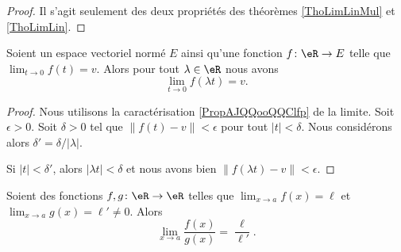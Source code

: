 \begin{proof}
	Il s'agit seulement des deux propriétés des théorèmes \ref{ThoLimLinMul} et \ref{ThoLimLin}.
\end{proof}

\begin{lemma}       \label{LEMooYJGLooVBaglB}
	Soient un espace vectoriel normé \( E\) ainsi qu'une fonction \( f\colon \eR\to E\) telle que \( \lim_{t\to 0} f(t)=v\). Alors pour tout \( \lambda\in \eR\) nous avons
	\begin{equation}
		\lim_{t\to 0} f(\lambda t)=v.
	\end{equation}
\end{lemma}

\begin{proof}
	Nous utilisons la caractérisation \eqref{PropAJQQooQQClfp} de la limite. Soit \( \epsilon>0\). Soit \( \delta>0\) tel que \( \| f(t)-v \|<\epsilon\) pour tout \( | t |<\delta\). Nous considérons alors \( \delta'=\delta/| \lambda |\).

	Si \( | t |<\delta'\), alors \( | \lambda t |<\delta\) et nous avons bien \( \| f(\lambda t)-v \|<\epsilon\).
\end{proof}

\begin{proposition}      \label{PROPooOUPNooTrClHw}
	Soient des fonctions \( f,g\colon \eR\to \eR\) telles que \( \lim_{x\to a} f(x)=\ell\) et \( \lim_{x\to a} g(x)=\ell'\neq 0\). Alors
	\begin{equation}
		\lim_{x\to a} \frac{ f(x) }{ g(x) }=\frac{ \ell }{ \ell' }.
	\end{equation}
\end{proposition}

